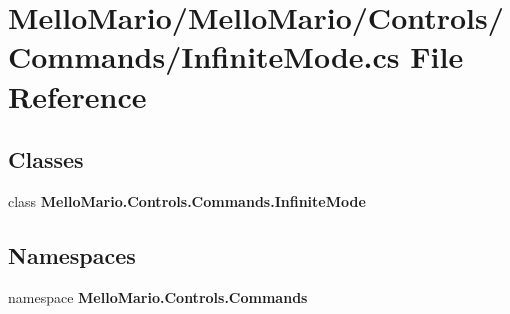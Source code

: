 \section{Mello\+Mario/\+Mello\+Mario/\+Controls/\+Commands/\+Infinite\+Mode.cs File Reference}
\label{InfiniteMode_8cs}
\subsection*{Classes}
\begin{DoxyCompactItemize}
\item 
class \textbf{ Mello\+Mario.\+Controls.\+Commands.\+Infinite\+Mode}
\end{DoxyCompactItemize}
\subsection*{Namespaces}
\begin{DoxyCompactItemize}
\item 
namespace \textbf{ Mello\+Mario.\+Controls.\+Commands}
\end{DoxyCompactItemize}
